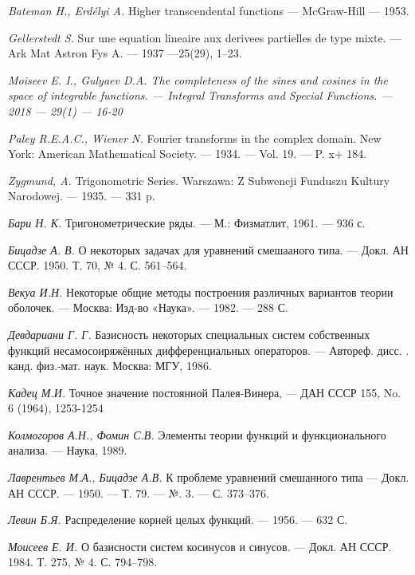\documentclass[oneside, final, 14pt]{extreport}
\begin{document}
\begin{thebibliography}{30}

	{\it Bateman H., Erd{\'e}lyi A.} Higher transcendental functions — 
	McGraw-Hill — 1953.
	
	{\it Gellerstedt S.} Sur une equation lineaire aux derivees partielles de type mixte. — 
	Ark Mat Astron Fys A. — 1937 —25(29), 1–23. 
	
	\it{Moiseev E. I., Gulyaev D.A.}
	The completeness of the sines and cosines in the space of integrable functions. —
	Integral Transforms and Special Functions. — 2018 — 29(1) — 16-20

	{\it Paley R.E.A.C., Wiener N.} Fourier transforms in the complex domain. 
	New York: American Mathematical Society. — 1934. — Vol. 19. — P. x+ 184.
	
	{\it Zygmund, A.} Trigonometric Series. 
		Warszawa: Z Subwencji Funduszu Kultury Narodowej. — 1935. — 331 p.
	
	{\it Бари Н. К.} Тригонометрические ряды. —
	М.: Физматлит, 1961. — 936 с.
	
	{\it Бицадзе А. В. } О некоторых задачах для уравнений смешааного типа. —
	Докл. АН СССР. 1950. Т. 70, № 4. С. 561–564.
	
	{\it Векуа И.Н.} Некоторые общие методы построения различных вариантов теории оболочек. — 
	Москва: Изд-во «Наука». — 1982. — 288 С.
	
	{\it Девдариани Г. Г.} Базисность некоторых специальных систем собственных функций несамосоиряжённых дифференциальных операторов. —
	Автореф. дисс. . канд. физ.-мат. наук. Москва: МГУ, 1986.
	
	{\it Кадец М.И.} Точное значение постоянной Палея-Винера, —
	ДАН СССР 155, No. 6 (1964), 1253-1254
	
	{\it Колмогоров А.Н., Фомин С.В.} Элементы теории функций и функционального анализа. —
	Наука, 1989.
	
	{\it Лаврентьев М.А., Бицадзе А.В.} К проблеме уравнений смешанного типа — 
	Докл. АН СССР. — 1950. — Т. 79. — №. 3. — С. 373–376.

	{\it Левин Б.Я.} Распределение корней целых функций. — 1956. — 632 С.
	
	{\it Моисеев Е. И.} О базисности систем косинусов и синусов. —
	Докл. АН СССР. 1984. Т. 275, № 4. С. 794–798.
	

\end{thebibliography}
\end{document}
